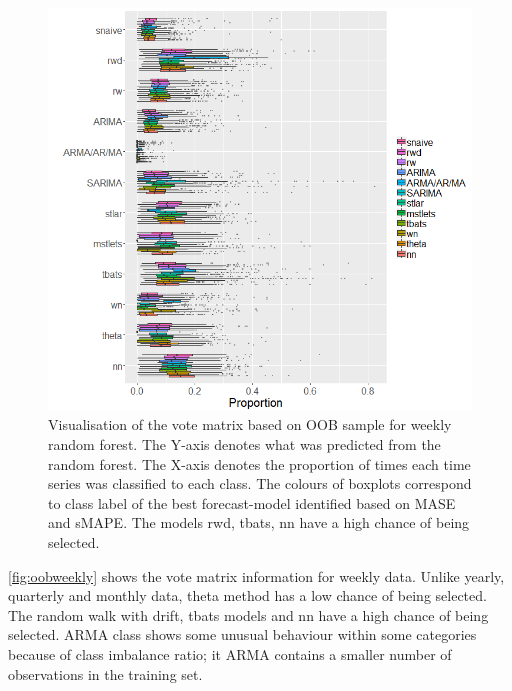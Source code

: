 \documentclass[11pt,a4paper,]{article}
\begin{document}
\begin{figure}
\centering
\includegraphics{figures/oobweekly-1.png}
\caption{\label{fig:oobweekly}Visualisation of the vote matrix based on OOB sample for weekly random forest. The Y-axis denotes what was predicted from the random forest. The X-axis denotes the proportion of times each time series was classified to each class. The colours of boxplots correspond to class label of the best forecast-model identified based on MASE and sMAPE. The models rwd, tbats, nn have a high chance of being selected.}
\end{figure}

\autoref{fig:oobweekly} shows the vote matrix information for weekly data. Unlike yearly, quarterly and monthly data, theta method has a low chance of being selected. The random walk with drift, tbats models and nn have a high chance of being selected. ARMA class shows some unusual behaviour within some categories because of class imbalance ratio; it ARMA contains a smaller number of observations in the training set.
\end{document}

